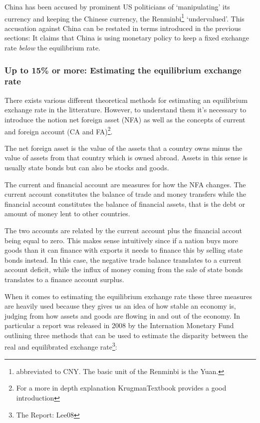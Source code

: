 \documentclass[11pt]{article}
\begin{document}
China has been 
accused by prominent US politicians of `manipulating' its currency and 
keeping the Chinese currency, the Renminbi\footnote{abbreviated to CNY. 
The basic unit of the Renminbi is the Yuan.} `undervalued'. This accusation against China can be restated in terms introduced in the previous sections: It claims that China is using monetary policy to keep a 
fixed exchange rate \emph{below} the equilibrium rate. 

\subsubsection{Up to 15\% or more: Estimating the equilibrium exchange rate}

There exists various different theoretical methods for estimating an 
equilibrium exchange rate in the litterature. However, to understand 
them it's necessary to introduce the notion net foreign asset (NFA) as 
well as the concepts of current and foreign account (CA and 
FA)\footnote{For a more in depth explanation \cite{ch.  
18}{KrugmanTextbook} provides a good introduction}.

The net foreign asset is the value of the assets that a country owns 
minus the value of assets from that country which is owned abroad.  
Assets in this sense is usually state bonds but can also be stocks and 
goods.  

The current and financial account are measures for how the NFA changes.  
The current account constitutes the balance of trade and money transfers 
while the financial account constitutes the balance of financial assets, 
that is the debt or amount of money lent to other countries. 

The two accounts are related by the current account plus the financial 
accout being equal to zero. This makes sense intuitively since if a 
nation buys more goods than it can finance with exports it needs to 
finance this by selling state bonds instead. In this case, the negative 
trade balance translates to a current account deficit, while the influx 
of money coming from the sale of state bonds translates to a finance 
account surplus.

When it comes to estimating the equilibrium exchange rate these three 
measures are heavily used because they gives us an idea of how stable an 
economy is, judging from how assets and goods are flowing in and out of 
the economy. In particular a report was released in 2008 by the 
Internation Monetary Fund outlining three methods that can be used to 
estimate the disparity between the real and equilibrated exchange 
rate\footnote{The Report: \cite{pp.  1}{Lee08}}:
\end{document}
